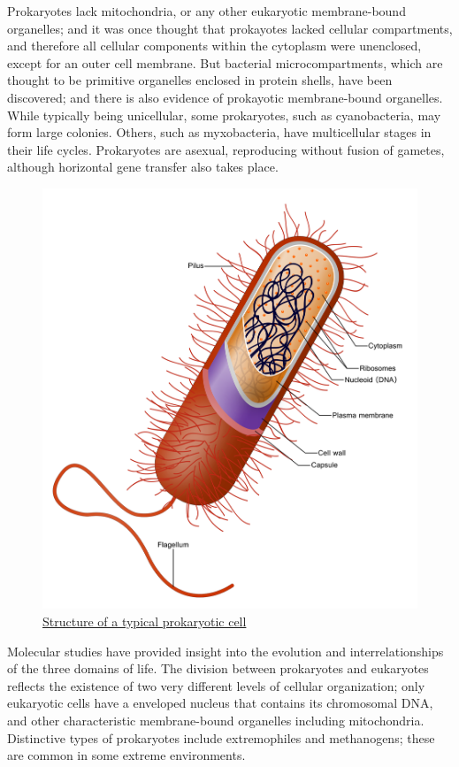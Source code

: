 Prokaryotes lack mitochondria, or any other eukaryotic membrane-bound organelles; and it was once thought that prokayotes lacked cellular compartments, and therefore all cellular components within the cytoplasm were unenclosed, except for an outer cell membrane. But bacterial microcompartments, which are thought to be primitive organelles enclosed in protein shells, have been discovered; and there is also evidence of prokayotic membrane-bound organelles. While typically being unicellular, some prokaryotes, such as cyanobacteria, may form large colonies. Others, such as myxobacteria, have multicellular stages in their life cycles. Prokaryotes are asexual, reproducing without fusion of gametes, although horizontal gene transfer also takes place.



\begin{figure}

{\centering \includegraphics[width=0.7\linewidth]{./figures/cells/Prokaryote_cell} 

}

\caption{\href{https://commons.wikimedia.org/wiki/File:Prokaryote_cell.svg}{Structure of a typical prokaryotic cell}}\label{fig:typicalprokcell}
\end{figure}

Molecular studies have provided insight into the evolution and interrelationships of the three domains of life. The division between prokaryotes and eukaryotes reflects the existence of two very different levels of cellular organization; only eukaryotic cells have a enveloped nucleus that contains its chromosomal DNA, and other characteristic membrane-bound organelles including mitochondria. Distinctive types of prokaryotes include extremophiles and methanogens; these are common in some extreme environments.


